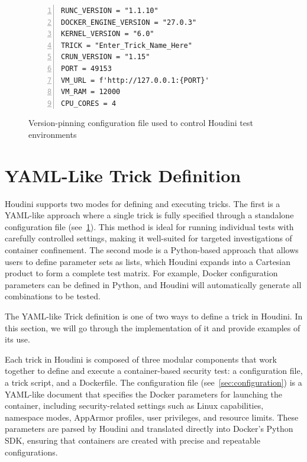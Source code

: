 \begin{doublespace}
\begin{figure}[H]
\caption{Version-pinning configuration file used to control Houdini test environments}
\label{fig:version-pinning-configuration-implementation}
\begin{lstlisting}[caption={}, numbers=left, numberstyle=\tiny, stepnumber=1, breaklines=true, frame=single, backgroundcolor=\color{gray!10}, basicstyle=\ttfamily\scriptsize, showspaces=false, showstringspaces=false]
RUNC_VERSION = "1.1.10"
DOCKER_ENGINE_VERSION = "27.0.3"
KERNEL_VERSION = "6.0"
TRICK = "Enter_Trick_Name_Here"
CRUN_VERSION = "1.15"
PORT = 49153
VM_URL = f'http://127.0.0.1:{PORT}'
VM_RAM = 12000
CPU_CORES = 4
\end{lstlisting}
\end{figure}

\section{YAML-Like Trick Definition}
\label{sec:yaml-trick}

Houdini supports two modes for defining and executing tricks. The first is a YAML-like approach where a single trick is fully specified through a standalone configuration file (see~\ref{fig:version-pinning-configuration-implementation}). This method is ideal for running individual tests with carefully controlled settings, making it well-suited for targeted investigations of container confinement. The second mode is a Python-based approach that allows users to define parameter sets as lists, which Houdini expands into a Cartesian product to form a complete test matrix. For example, Docker configuration parameters can be defined in Python, and Houdini will automatically generate all combinations to be tested.

The YAML-like Trick definition is one of two ways to define a trick in Houdini. In this section, we will go through the implementation of it and provide examples of its use.

Each trick in Houdini is composed of three modular components that work together to define and execute a container-based security test: a configuration file, a trick script, and a Dockerfile. The configuration file (see~\ref{sec:configuration}) is a YAML-like document that specifies the Docker parameters for launching the container, including security-related settings such as Linux capabilities, namespace modes, AppArmor profiles, user privileges, and resource limits. These parameters are parsed by Houdini and translated directly into Docker's Python SDK, ensuring that containers are created with precise and repeatable configurations.


\end{doublespace}
